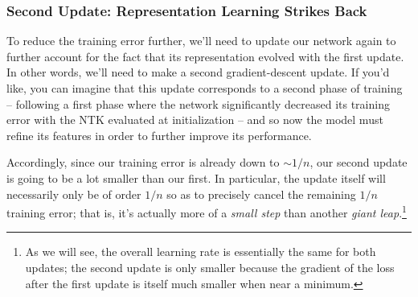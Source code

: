 \subsubsection{Second Update: Representation Learning Strikes Back}
To reduce the training error further, we'll need to update our network again to further account for the fact that its representation evolved with the first update.  
In other words, we'll need to make a second gradient-descent update. 
If you'd like, you can imagine that this update 
corresponds to a second phase of training -- following a first phase where the network significantly decreased its training error with the NTK evaluated at initialization --
and so now the model must refine its features in order to further improve its performance.

Accordingly, since our training error is already down to $\sim 1/n$, our second update is going to be a lot smaller than our first. In particular, the update itself will necessarily only be of order $1/n$ so as to precisely cancel the remaining $1/n$ training error; that is, it's actually more of a \emph{small step} than another \emph{giant leap}.\footnote{
As we will see, the overall learning rate is essentially the same for both updates; the second update is only smaller because the gradient of the loss after the first update is itself much smaller when near a minimum.
}


